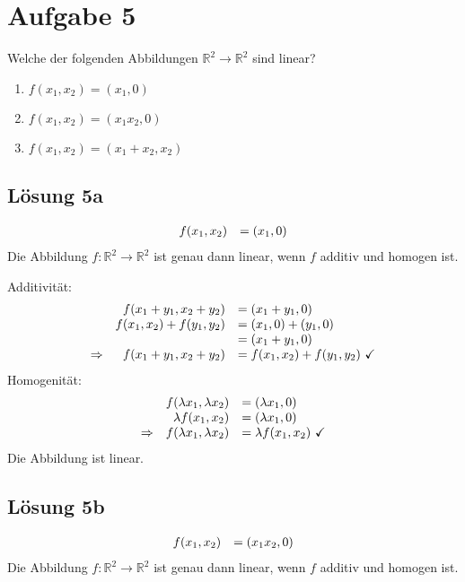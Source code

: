 \documentclass[main.tex]{subfiles}
\begin{document}
\section{Aufgabe 5}
Welche der folgenden Abbildungen $\mathbb{R}^{2}\rightarrow \mathbb{R}^{2}$ sind linear?

\begin{enumerate}
    \item $f( x_{1} ,x_{2}) =( x_{1} ,0)$
    \item $f( x_{1} ,x_{2}) =( x_{1} x_{2} ,0)$
    \item $f( x_{1} ,x_{2}) =( x_{1} +x_{2} ,x_{2})$
\end{enumerate}

\subsection{Lösung 5a}
\begin{equation*}
    \begin{array}{ r l }
    f( x_{1} ,x_{2}) & =( x_{1} ,0)
    \end{array}
\end{equation*}
Die Abbildung $f:\mathbb{R}^{2}\rightarrow \mathbb{R}^{2}$ ist genau dann linear, wenn $f$ additiv und homogen ist.

Additivität:
\begin{equation*}
    \begin{array}{ r r l }
    & f( x_{1} +y_{1} ,x_{2} +y_{2}) & =( x_{1} +y_{1} ,0)\\
    & f( x_{1} ,x_{2}) +f( y_{1} ,y_{2}) & =( x_{1} ,0) +( y_{1} ,0)\\
    &  & =( x_{1} +y_{1} ,0)\\
    \Rightarrow  & f( x_{1} +y_{1} ,x_{2} +y_{2}) & =f( x_{1} ,x_{2}) +f( y_{1} ,y_{2}) \ \checkmark
    \end{array}
\end{equation*}
Homogenität:
\begin{equation*}
    \begin{array}{ r r l }
    & f( \lambda x_{1} ,\lambda x_{2}) & =( \lambda x_{1} ,0)\\
    & \lambda f( x_{1} ,x_{2}) & =( \lambda x_{1} ,0)\\
    \Rightarrow  & f( \lambda x_{1} ,\lambda x_{2}) & =\lambda f( x_{1} ,x_{2}) \ \checkmark
    \end{array}
\end{equation*}
Die Abbildung ist linear.

\subsection{Lösung 5b}
\begin{equation*}
    \begin{array}{ r l }
    f( x_{1} ,x_{2}) & =( x_{1} x_{2} ,0)
    \end{array}
\end{equation*}
Die Abbildung $f:\mathbb{R}^{2}\rightarrow \mathbb{R}^{2}$ ist genau dann linear, wenn $f$ additiv und homogen ist.
\end{document}
